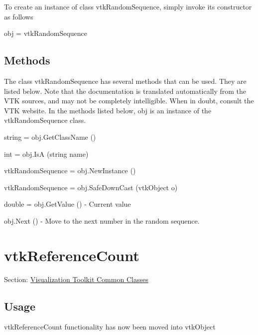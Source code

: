To create an instance of class vtk\-Random\-Sequence, simply invoke its constructor as follows \begin{DoxyVerb}  obj = vtkRandomSequence
\end{DoxyVerb}
 \hypertarget{vtkwidgets_vtkxyplotwidget_Methods}{}\subsection{Methods}\label{vtkwidgets_vtkxyplotwidget_Methods}
The class vtk\-Random\-Sequence has several methods that can be used. They are listed below. Note that the documentation is translated automatically from the V\-T\-K sources, and may not be completely intelligible. When in doubt, consult the V\-T\-K website. In the methods listed below, {\ttfamily obj} is an instance of the vtk\-Random\-Sequence class. 
\begin{DoxyItemize}
\item {\ttfamily string = obj.\-Get\-Class\-Name ()}  
\item {\ttfamily int = obj.\-Is\-A (string name)}  
\item {\ttfamily vtk\-Random\-Sequence = obj.\-New\-Instance ()}  
\item {\ttfamily vtk\-Random\-Sequence = obj.\-Safe\-Down\-Cast (vtk\-Object o)}  
\item {\ttfamily double = obj.\-Get\-Value ()} -\/ Current value  
\item {\ttfamily obj.\-Next ()} -\/ Move to the next number in the random sequence.  
\end{DoxyItemize}\hypertarget{vtkcommon_vtkreferencecount}{}\section{vtk\-Reference\-Count}\label{vtkcommon_vtkreferencecount}
Section\-: \hyperlink{sec_vtkcommon}{Visualization Toolkit Common Classes} \hypertarget{vtkwidgets_vtkxyplotwidget_Usage}{}\subsection{Usage}\label{vtkwidgets_vtkxyplotwidget_Usage}
vtk\-Reference\-Count functionality has now been moved into vtk\-Object


